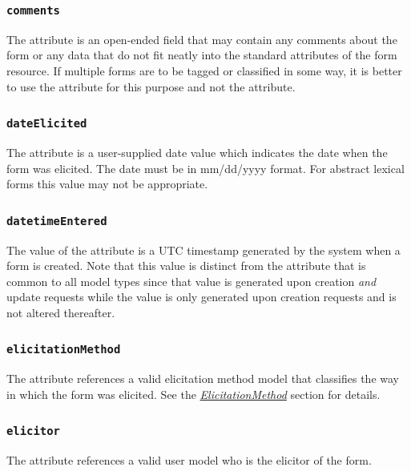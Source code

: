 \documentclass[letterpaper,10pt,english]{sphinxmanual}
\begin{document}
\subsubsection{\texttt{comments}}
\label{datastructure:comments}
The  attribute is an open-ended field that may contain any comments
about the form or any data that do not fit neatly into the standard attributes
of the form resource.  If multiple forms are to be tagged or classified in some
way, it is better to use the  attribute for this purpose and not the
 attribute.


\subsubsection{\texttt{dateElicited}}
\label{datastructure:id19}
The  attribute is a user-supplied date value which indicates the
date when the form was elicited.  The date must be in mm/dd/yyyy format.  For
abstract lexical forms this value may not be appropriate.


\subsubsection{\texttt{datetimeEntered}}
\label{datastructure:id20}
The value of the  attribute is a UTC timestamp generated by
the system when a form is created.  Note that this value is distinct from the
 attribute that is common to all model types since that
value is generated upon creation \emph{and} update requests while the
 value is only generated upon creation requests and is not
altered thereafter.


\subsubsection{\texttt{elicitationMethod}}
\label{datastructure:id21}
The  attribute references a valid elicitation method model
that classifies the way in which the form was elicited.  See the
{\hyperref[datastructure:elicitation-method-data-structure]{\emph{ElicitationMethod}}} section for details.


\subsubsection{\texttt{elicitor}}
\label{datastructure:id22}
The  attribute references a valid user model who is the elicitor of
the form.
\end{document}

